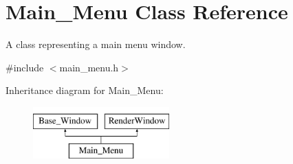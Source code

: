 \hypertarget{classMain__Menu}{}\section{Main\+\_\+\+Menu Class Reference}
\label{classMain__Menu}


A class representing a main menu window.  




{\ttfamily \#include $<$main\+\_\+menu.\+h$>$}

Inheritance diagram for Main\+\_\+\+Menu\+:\begin{figure}[H]
\begin{center}
\leavevmode
\includegraphics[height=2.000000cm]{classMain__Menu}
\end{center}
\end{figure}
